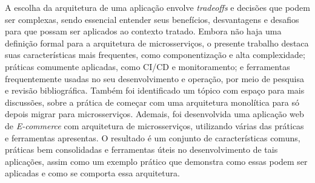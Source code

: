 \setlength{\absparsep}{18pt} %
\begin{resumo}

A escolha da arquitetura de uma aplicação envolve \emph{tradeoffs} e decisões que podem ser complexas, sendo essencial entender seus benefícios, desvantagens e desafios para que possam ser aplicados ao contexto tratado. Embora não haja uma definição formal para a arquitetura de microsserviços, o presente trabalho destaca suas características mais frequentes, como componentização e alta complexidade; práticas comumente aplicadas, como CI/CD e monitoramento; e ferramentas frequentemente usadas no seu desenvolvimento e operação, por meio de pesquisa e revisão bibliográfica. Também foi identificado um tópico com espaço para mais discussões, sobre a prática de começar com uma arquitetura monolítica para só depois migrar para microsserviços. Ademais, foi desenvolvida uma aplicação web de \emph{E-commerce} com arquitetura de microsserviços, utilizando várias das práticas e ferramentas apresentas. O resultado é um conjunto de características comuns, práticas bem consolidadas e ferramentas úteis no desenvolvimento de tais aplicações, assim como um exemplo prático que demonstra como essas podem ser aplicadas e como se comporta essa arquitetura.




\end{resumo}
